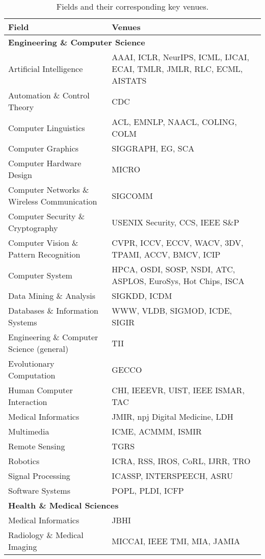 \begin{table*}[htbp]
\centering
\small
\begin{tabular}{p{5cm} p{10cm}}
\toprule
\textbf{Field} & \textbf{Venues} \\
\midrule

\multicolumn{2}{l}{\textbf{Engineering \& Computer Science}} \\
Artificial Intelligence & AAAI, ICLR, NeurIPS, ICML, IJCAI, ECAI, TMLR, JMLR, RLC, ECML, AISTATS \\
Automation \& Control Theory & CDC \\
Computer Linguistics & ACL, EMNLP, NAACL, COLING, COLM \\
Computer Graphics & SIGGRAPH, EG, SCA \\
Computer Hardware Design & MICRO \\
Computer Networks \& Wireless Communication & SIGCOMM \\
Computer Security \& Cryptography & USENIX Security, CCS, IEEE S\&P \\
Computer Vision \& Pattern Recognition & CVPR, ICCV, ECCV, WACV, 3DV, TPAMI, ACCV, BMCV, ICIP \\
Computer System & HPCA, OSDI, SOSP, NSDI, ATC, ASPLOS, EuroSys, Hot Chips, ISCA \\
Data Mining \& Analysis & SIGKDD, ICDM \\
Databases \& Information Systems & WWW, VLDB, SIGMOD, ICDE, SIGIR \\
Engineering \& Computer Science (general) & TII \\
Evolutionary Computation & GECCO \\
Human Computer Interaction & CHI, IEEEVR, UIST, IEEE ISMAR, TAC \\
Medical Informatics & JMIR, npj Digital Medicine, LDH \\
Multimedia & ICME, ACMMM, ISMIR \\
Remote Sensing & TGRS \\
Robotics & ICRA, RSS, IROS, CoRL, IJRR, TRO \\
Signal Processing & ICASSP, INTERSPEECH, ASRU \\
Software Systems & POPL, PLDI, ICFP \\
\midrule

\multicolumn{2}{l}{\textbf{Health \& Medical Sciences}} \\
Medical Informatics & JBHI \\
Radiology \& Medical Imaging & MICCAI, IEEE TMI, MIA, JAMIA \\

\bottomrule
\end{tabular}
\caption{Fields and their corresponding key venues.}
\label{tab:fields_venues}
\end{table*}